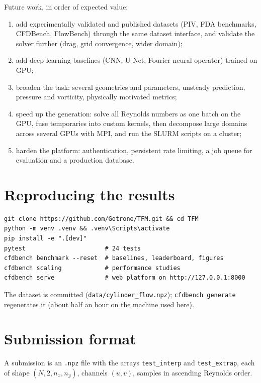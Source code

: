 \documentclass[11pt,a4paper]{article}
\begin{document}
Future work, in order of expected value:
\begin{enumerate}
  \item add experimentally validated and published datasets (PIV, FDA benchmarks, CFDBench, FlowBench) through the same dataset interface, and validate the solver further (drag, grid convergence, wider domain);
  \item add deep-learning baselines (CNN, U-Net, Fourier neural operator) trained on GPU;
  \item broaden the task: several geometries and parameters, unsteady prediction, pressure and vorticity, physically motivated metrics;
  \item speed up the generation: solve all Reynolds numbers as one batch on the GPU, fuse temporaries into custom kernels, then decompose large domains across several GPUs with MPI, and run the SLURM scripts on a cluster;
  \item harden the platform: authentication, persistent rate limiting, a job queue for evaluation and a production database.
\end{enumerate}

\appendix
\section{Reproducing the results}
\begin{lstlisting}
git clone https://github.com/Gotrone/TFM.git && cd TFM
python -m venv .venv && .venv\Scripts\activate
pip install -e ".[dev]"
pytest                      # 24 tests
cfdbench benchmark --reset  # baselines, leaderboard, figures
cfdbench scaling            # performance studies
cfdbench serve              # web platform on http://127.0.0.1:8000
\end{lstlisting}
The dataset is committed (\texttt{data/cylinder\_flow.npz}); \texttt{cfdbench generate} regenerates it (about half an hour on the machine used here).

\section{Submission format}
A submission is an \texttt{.npz} file with the arrays \texttt{test\_interp} and \texttt{test\_extrap}, each of shape $(N,2,n_x,n_y)$, channels $(u,v)$, samples in ascending Reynolds order.
\end{document}

